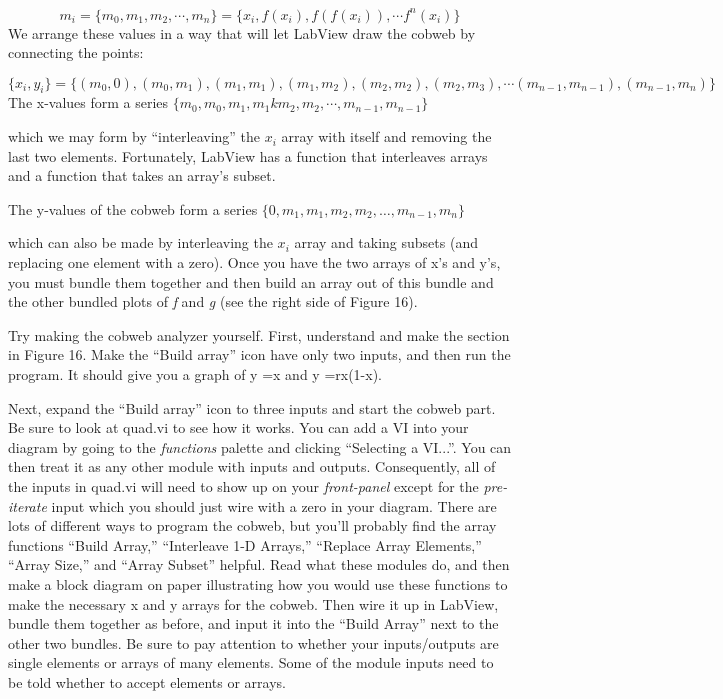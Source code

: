 \documentclass{../lab}
\begin{document}
\begin{equation}
    m_i= \{m_0,m_1,m_2,\cdots ,m_n\}= \{x_i,f(x_i),f(f(x_i)),\cdots f^n(x_i)\}
\end{equation}
We arrange these values in a way that will let LabView draw the cobweb by connecting the points:

\begin{equation}
    \{x_i,y_i\}=\{(m_0,0),(m_0,m_1),(m_1,m_1),(m_1,m_2),(m_2,m_2),(m_2,m_3),\cdots (m_{n-1},m_{n-1}),(m_{n-1},m_n)\}
\end{equation}
The x-values form a series $ \{m_0,m_0,m_1,m_1km_2,m_2,\cdots,m_{n-1},m_{n-1}\} $

which we may form by ``interleaving'' the $ x_i $ array with itself and removing the last two elements. Fortunately, LabView has a function that interleaves arrays and a function that takes an array's subset.

The y-values of the cobweb form a series $ \{0,m_1,m_1,m_2,m_2,\ldots ,m_{n-1},m_n\} $

which can also be made by interleaving the $ x_i $ array and taking subsets (and replacing one element with a zero). Once you have the two arrays of x's and y's, you must bundle them together and then build an array out of this bundle and the other bundled plots of \emph{f} and \emph{g} (see the right side of Figure 16).

Try making the cobweb analyzer yourself. First, understand and make the section in Figure 16. Make the ``Build array'' icon have only two inputs, and then run the program. It should give you a graph of y =x and y =rx(1-x).

Next, expand the ``Build array'' icon to three inputs and start the cobweb part. Be sure to look at quad.vi to see how it works. You can add a VI into your diagram by going to the \emph{functions} palette and clicking ``Selecting a VI...''. You can then treat it as any other module with inputs and outputs. Consequently, all of the inputs in quad.vi will need to show up on your \emph{front-panel} except for the \emph{pre-iterate} input which you should just wire with a zero in your diagram. There are lots of different ways to program the cobweb, but you'll probably find the array functions ``Build Array,'' ``Interleave 1-D Arrays,'' ``Replace Array Elements,'' ``Array Size,'' and ``Array Subset'' helpful. Read what these modules do, and then make a block diagram on paper illustrating how you would use these functions to make the necessary x and y arrays for the cobweb. Then wire it up in LabView, bundle them together as before, and input it into the ``Build Array'' next to the other two bundles. Be sure to pay attention to whether your inputs/outputs are single elements or arrays of many elements. Some of the module inputs need to be told whether to accept elements or arrays.
\end{document}
